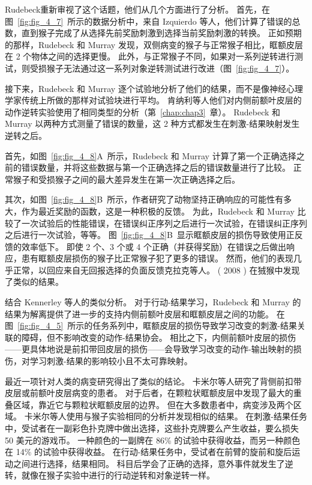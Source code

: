 Rudebeck\cite{rudebeck2008frontal}重新审视了这个话题，他们从几个方面进行了分析。
首先，在图~\ref{fig:fig_4_7}~所示的数据分析中，来自 Izquierdo 等人\cite{izquierdo2004bilateral}，他们计算了错误的总数，直到猴子完成了从选择先前奖励刺激到选择当前奖励刺激的转换。
正如预期的那样，Rudebeck 和 Murray 发现，双侧病变的猴子与正常猴子相比，眶额皮层在 2 个物体之间的选择更慢。
此外，与正常猴子不同，如果对一系列逆转进行测试，则受损猴子无法通过这一系列对象逆转测试进行改进（图~\ref{fig:fig_4_7}）。\par


接下来，Rudebeck 和 Murray 逐个试验地分析了他们的结果，而不是像神经心理学家传统上所做的那样对试验块进行平均。
肯纳利等人\cite{kennerley2006optimal}他们对内侧前额叶皮层的动作逆转实验使用了相同类型的分析（第~\ref{chap:chap3}~章）。
Rudebeck 和 Murray 以两种方式测量了错误的数量，这 2 种方式都发生在刺激-结果映射发生逆转之后。\par


首先，如图~\ref{fig:fig_4_8}A~所示，Rudebeck 和 Murray 计算了第一个正确选择之前的错误数量，并将这些数据与第一个正确选择之后的错误数量进行了比较。
正常猴子和受损猴子之间的最大差异发生在第一次正确选择之后。\par


其次，如图~\ref{fig:fig_4_8}B~所示，作者研究了动物坚持正确响应的可能性有多大，作为最近奖励的函数，这是一种积极的反馈。
为此，Rudebeck 和 Murray 比较了一次试验后的性能错误，在错误纠正序列之后进行一次试验，在错误纠正序列之后进行一次试验，等等。
图~\ref{fig:fig_4_8}B~显示眶额皮层的损伤导致使用正反馈的效率低下。
即使 2 个、3 个或 4 个正确（并获得奖励）在错误之后做出响应，患有眶额皮层损伤的猴子比正常猴子犯了更多的错误。
然而，他们的表现几乎正常，以回应来自无回报选择的负面反馈\cite{rudebeck2008frontal}克拉克等人。
( 2008 ) 在狨猴中发现了类似的结果。\par


结合 Kennerley 等人的类似分析\cite{kennerley2006optimal}。
对于行动-结果学习，Rudebeck 和 Murray 的结果为解离提供了进一步的支持内侧前额叶皮层和眶额皮层之间的功能。
在图~\ref{fig:fig_4_5}~所示的任务系列中，眶额皮层的损伤导致学习改变的刺激-结果关联的障碍，但不影响改变的动作-结果协会。
相比之下，内侧前额叶皮层的损伤——更具体地说是前扣带回皮层的损伤——会导致学习改变的动作-输出映射的损伤，对学习刺激-结果的影响较小且不太可靠映射。\par


最近一项针对人类的病变研究得出了类似的结论。
卡米尔等人\cite{camille2011double}研究了背侧前扣带皮层或前额叶皮层病变的患者。
对于后者，在颗粒状眶额皮层中发现了最大的重叠区域，靠近它与颗粒状眶额皮层的边界。
但在大多数患者中，病变涉及两个区域。
卡米尔等人使用与猴子实验相同的分析并发现相似的结果。
在刺激-结果任务中，受试者在一副彩色扑克牌中做出选择，这些扑克牌要么产生收益，要么损失 50 美元的游戏币。
一种颜色的一副牌在 86\% 的试验中获得收益，而另一种颜色在 14\% 的试验中获得收益。
在行动-结果任务中，受试者在前臂的旋前和旋后运动之间进行选择，结果相同。
科目后学会了正确的选择，意外事件就发生了逆转，就像在猴子实验中进行的行动逆转和对象逆转一样。\par



